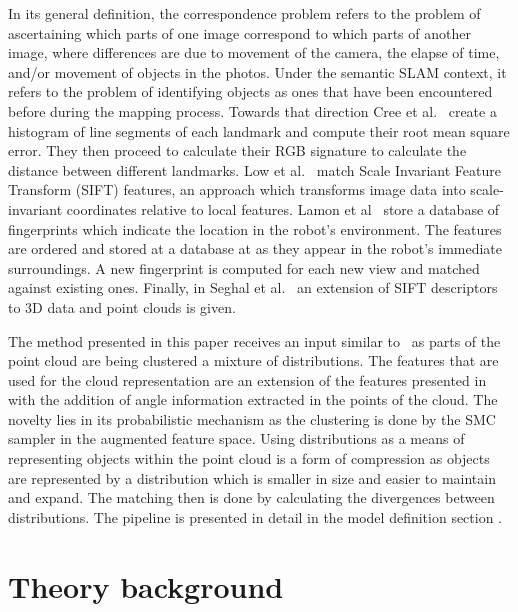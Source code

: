 \documentclass[twoside,hidelinks]{article}
\begin{document}
In its general definition, the correspondence problem refers to the problem of ascertaining which parts of one image correspond to which parts of another image, where differences are due to movement of the camera, the elapse of time, and/or movement of objects in the photos. Under the semantic SLAM context, it refers to the problem of identifying objects as ones that have been encountered before during the mapping process. Towards that direction Cree et al.~\cite{corresp:first} create a histogram of line segments of each landmark and compute their root mean square error. They then proceed to calculate their RGB signature to calculate the distance between different landmarks. Low et al.~\cite{corres:sec} match Scale Invariant Feature Transform (SIFT) features, an approach which transforms image data into scale-invariant coordinates relative to local features. Lamon et al~\cite{corres:three} store a database of fingerprints which indicate the location in the robot's environment. The features are ordered and stored at a database at as they appear in the robot's immediate surroundings. A new fingerprint is computed for each new view and matched against existing ones. Finally, in Seghal et al.~\cite{corres:four} an extension of SIFT descriptors to 3D data and point clouds is given.

The method presented in this paper receives an input similar to~\cite{objectDisc} as parts of the point cloud are being clustered a mixture of distributions. The features that are used for the cloud representation are an extension of the features presented in~\cite{smcddp} with the addition of angle information extracted in the points of the cloud. The novelty lies in its probabilistic mechanism as the clustering is done by the SMC sampler in the augmented feature space. Using distributions as a means of representing objects within the point cloud is a form of compression as objects are represented by a distribution which is smaller in size and easier to maintain and expand. The matching then is done by calculating the divergences between distributions. The pipeline is presented in detail in the model definition section	.
  



\section{Theory background}
\label{sec:theory}
\end{document}
